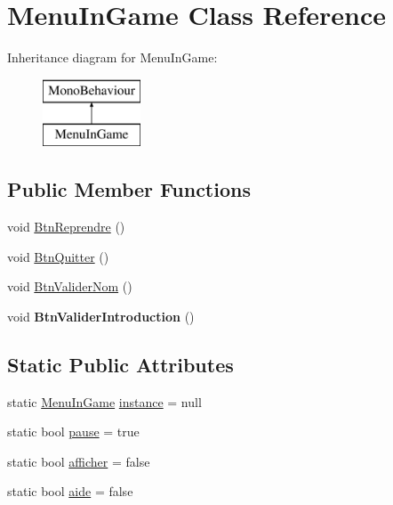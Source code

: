 \hypertarget{class_menu_in_game}{}\section{Menu\+In\+Game Class Reference}
\label{class_menu_in_game}
Inheritance diagram for Menu\+In\+Game\+:\begin{figure}[H]
\begin{center}
\leavevmode
\includegraphics[height=2.000000cm]{class_menu_in_game}
\end{center}
\end{figure}
\subsection*{Public Member Functions}
\begin{DoxyCompactItemize}
\item 
void \mbox{\hyperlink{class_menu_in_game_a1b037f338e34dda73cd80cd6ec0467ec}{Btn\+Reprendre}} ()
\item 
void \mbox{\hyperlink{class_menu_in_game_a65e24e71034cd8b218c999b07a18bc56}{Btn\+Quitter}} ()
\item 
void \mbox{\hyperlink{class_menu_in_game_af5b66d9ceddf95d9ed6c61791fed8fc6}{Btn\+Valider\+Nom}} ()
\item 
\mbox{\label{class_menu_in_game_adb26e8a8a8e157a5a0b34cd66a7a8c06}} 
void {\bfseries Btn\+Valider\+Introduction} ()
\end{DoxyCompactItemize}
\subsection*{Static Public Attributes}
\begin{DoxyCompactItemize}
\item 
static \mbox{\hyperlink{class_menu_in_game}{Menu\+In\+Game}} \mbox{\hyperlink{class_menu_in_game_a777dbf06adad3f6dad8d0b90a24443cc}{instance}} = null
\item 
static bool \mbox{\hyperlink{class_menu_in_game_af3d204a38d799fbbeb58057cb7350737}{pause}} = true
\item 
static bool \mbox{\hyperlink{class_menu_in_game_af5a87c978112f565b6accf24dfc5c99d}{afficher}} = false
\item 
static bool \mbox{\hyperlink{class_menu_in_game_adfa7f1418cd36076486043153ec0da7d}{aide}} = false
\end{DoxyCompactItemize}
